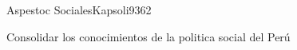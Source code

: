 \begin{syllabus}
\begin{unit}{Aspestoc Sociales}{Kapsoli93}{6}{2}
\begin{learningoutcomes}
      \item Consolidar los conocimientos de la politica social del Perú
\end{learningoutcomes}
\end{unit}



\begin{coursebibliography}
\end{coursebibliography}

\end{syllabus}
